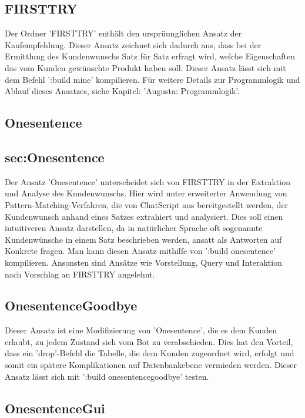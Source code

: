 \subsection{FIRSTTRY}
\label{sec:FIRSTTRY}

Der Ordner 'FIRSTTRY' enthält den ursprüunglichen Ansatz der Kaufempfehlung. Dieser Ansatz zeichnet sich dadurch aus, dass bei der Ermittlung des Kundenwunschs Satz für Satz erfragt wird, welche Eigenschaften das vom Kunden gewünschte Produkt haben soll. Dieser Ansatz lässt sich mit dem Befehl ':build mine' kompilieren. Für weitere Details zur Programmlogik und Ablauf dieses Ansatzes, siehe Kapitel: 'Augusta: Programmlogik'. 

\subsection{Onesentence}
\subsection{sec:Onesentence}

Der Ansatz 'Onesentence' unterscheidet sich von FIRSTTRY in der Extraktion und Analyse des Kundenwunschs. Hier wird unter erweiterter Anwendung von Pattern-Matching-Verfahren, die von ChatScript aus bereitgestellt werden, der Kundenwunsch anhand eines Satzes extrahiert und analysiert. Dies soll einen intuitiveren Ansatz darstellen, da in natürlicher Sprache oft sogenannte Kundenwünsche in einem Satz beschrieben werden, ansatt als Antworten auf Konkrete fragen. Man kann diesen Ansatz mithilfe von ':build onesentence' kompilieren. Ansonsten sind Ansätze wie Vorstellung, Query und Interaktion nach Vorschlag an FIRSTTRY angelehnt.

\subsection{OnesentenceGoodbye}
\label{sec:OnesentenceGoodbye}

Dieser Ansatz ist eine Modifizierung von 'Onesentence', die es dem Kunden erlaubt, zu jedem Zustand sich vom Bot zu verabschieden. Dies hat den Vorteil, dass ein 'drop'-Befehl die Tabelle, die dem Kunden zugeordnet wird, erfolgt und somit ein spätere Komplikationen auf Datenbankebene vermieden werden. Dieser Ansatz lässt sich mit ':build onesentencegoodbye' testen. 

\subsection{OnesentenceGui}
\label{sec:OnesentenceGui}

